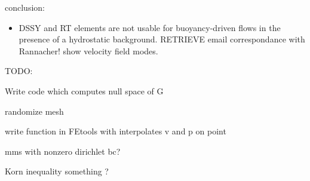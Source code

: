conclusion:

\begin{itemize}
\item DSSY and RT elements are not usable for buoyancy-driven flows in the presence of a hydrostatic 
background. RETRIEVE email correspondance with Rannacher! show velocity field modes. 
\end{itemize}


\newpage
TODO:

Write code which computes null space of G 

randomize mesh

write function in FEtools with interpolates v and p on point

mms with nonzero dirichlet bc?

Korn inequality something ?
